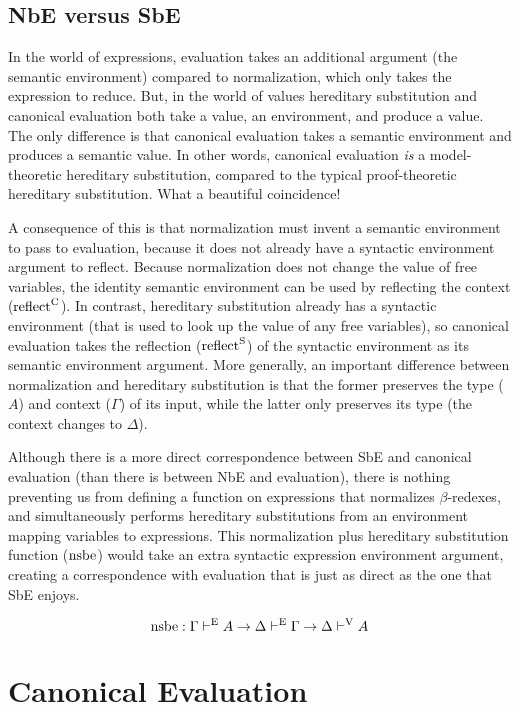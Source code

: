 \documentclass[runningheads,a4paper]{llncs}
\def\marr{\rightarrow}
\def\reflecte{\fun{reflect}^\con{S}}
\def\reflectc{\fun{reflect}^\con{C}}
\def\nsbe{\fun{nsbe}}
\newcommand{\turn}[1]{\vdash^\con{#1}}
\newcommand{\con}[1]{\textmd{#1}}
\newcommand{\fun}[1]{\textmd{#1}}
\newcommand{\type}[1]{\Gamma \turn{E} #1}
\newcommand{\dtypv}[1]{\Delta \turn{V} #1}
\def\enve{\Delta \turn{E} \Gamma}
\begin{document}
\subsection{NbE versus SbE}

In the world of expressions,
evaluation takes an additional argument (the semantic environment) compared
to normalization, which only takes the expression to reduce. But, in
the world of values hereditary substitution and canonical evaluation
both take a value, an environment, and produce a value. The only
difference is that canonical evaluation takes a semantic environment and
produces a semantic value. 
In other words, canonical evaluation \textit{is}
a model-theoretic hereditary substitution, compared to the typical
proof-theoretic hereditary substitution.
What a beautiful coincidence!

A consequence of this is that normalization must invent a semantic
environment to pass to evaluation, because it does not already
have a syntactic environment argument to reflect. Because normalization does not
change the value of free variables, the identity semantic environment
can be used by reflecting the context ($\reflectc$). In contrast, hereditary substitution already has
a syntactic environment (that is used to look up the value of any free
variables), so canonical evaluation takes the 
reflection ($\reflecte$) of the syntactic environment as its semantic
environment argument. More generally, an important difference between
normalization and hereditary substitution is that the former preserves
the type ($A$) and context ($\Gamma$) of its input, while the latter
only preserves its type (the context changes to $\Delta$).

Although there is a more direct correspondence between SbE and canonical
evaluation (than there is between NbE and evaluation), there is
nothing preventing us from defining a function on expressions that
normalizes $\beta$-redexes, and simultaneously performs hereditary
substitutions from an environment mapping variables to expressions.
This normalization plus hereditary substitution function ($\nsbe$) would take an
extra syntactic expression environment argument, creating a
correspondence with evaluation that is just as direct as the one that
SbE enjoys.

$$
\nsbe : \type{A} \marr \enve \marr \dtypv{A}
$$


\section{Canonical Evaluation}
\label{sec:ceval}
\end{document}
